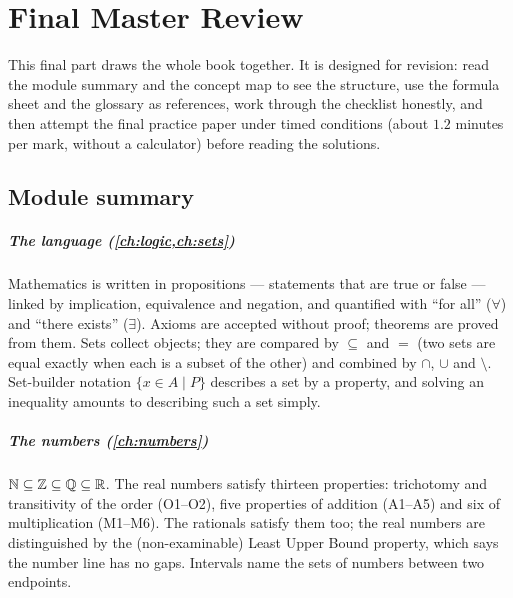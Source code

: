 \chapter{Final Master Review}\label{ch:review}

This final part draws the whole book together. It is designed for revision: read the module summary and the concept map
to see the structure, use the formula sheet and the glossary as references, work through the checklist honestly, and then
attempt the final practice paper under timed conditions (about $1.2$ minutes per mark, without a calculator) before reading
the solutions.

\section*{Module summary}

\paragraph{The language (\cref{ch:logic,ch:sets})} Mathematics is written in propositions --- statements that are true or
false --- linked by implication, equivalence and negation, and quantified with ``for all'' ($\forall$) and ``there exists''
($\exists$). Axioms are accepted without proof; theorems are proved from them. Sets collect objects; they are compared by
$\subseteq$ and $=$ (two sets are equal exactly when each is a subset of the other) and combined by $\cap$, $\cup$ and
$\setminus$. Set-builder notation $\{x\in A\mid P\}$ describes a set by a property, and solving an inequality amounts to
describing such a set simply.

\paragraph{The numbers (\cref{ch:numbers})} $\mathbb{N}\subseteq\mathbb{Z}\subseteq\mathbb{Q}\subseteq\mathbb{R}$. The real numbers satisfy thirteen
properties: trichotomy and transitivity of the order (O1--O2), five properties of addition (A1--A5) and six of
multiplication (M1--M6). The rationals satisfy them too; the real numbers are distinguished by the (non-examinable) Least
Upper Bound property, which says the number line has no gaps. Intervals name the sets of numbers between two endpoints.

